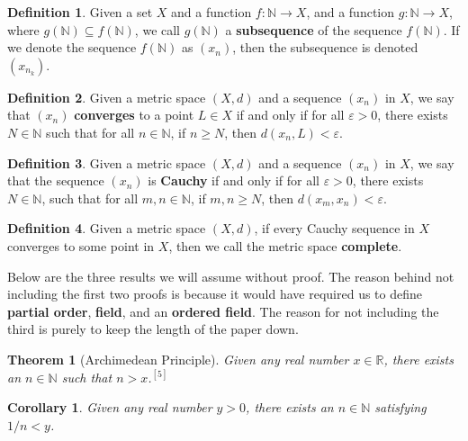 \documentclass{article}
\newtheorem{theorem}{Theorem}[section]
\newtheorem{corollary}{Corollary}[theorem]
\theoremstyle{definition}
\newtheorem{definition}{Definition}[section]
\theoremstyle{remark}
\theoremstyle{definition}
\begin{document}
\begin{definition}
    Given a set $X$ and a function $f\colon\mathbb{N}\rightarrow X$, and a function $g\colon\mathbb{N}\rightarrow X$, where $g(\mathbb{N})\subseteq f(\mathbb{N})$, we call $g(\mathbb{N})$ a \textbf{subsequence} of the sequence $f(\mathbb{N})$. If we denote the sequence $f(\mathbb{N})$ as $(x_n)$, then the subsequence is denoted $(x_{n_k})$.
\end{definition}

\begin{definition}
    Given a metric space $(X,d)$ and a sequence $(x_n)$ in $X$, we say that $(x_n)$ \textbf{converges} to a point $L\in X$ if and only if for all $\varepsilon>0$, there exists $N\in\mathbb{N}$ such that for all $n\in\mathbb{N}$, if $n\geq N$, then $d(x_n,L)<\varepsilon$.
\end{definition}

\begin{definition}
    Given a metric space $(X,d)$ and a sequence $(x_n)$ in $X$, we say that the sequence $(x_n)$ is \textbf{Cauchy} if and only if for all $\varepsilon>0$, there exists $N\in\mathbb{N}$, such that for all $m,n\in\mathbb{N}$, if $m,n\geq N$, then $d(x_m,x_n)<\varepsilon$.
\end{definition}

\begin{definition}
    Given a metric space $(X,d)$, if every Cauchy sequence in $X$ converges to some point in $X$, then we call the metric space \textbf{complete}.
\end{definition}

\vspace{4mm}

Below are the three results we will assume without proof. The reason behind not including the first two proofs is because it would have required us to define \textbf{partial order}, \textbf{field}, and an \textbf{ordered field}. The reason for not including the third is purely to keep the length of the paper down.

\vspace{4mm}

\begin{theorem}[Archimedean Principle]
    Given any real number $x\in\mathbb{R}$, there exists an $n\in\mathbb{N}$ such that $n>x$.$^{[5]}$
\end{theorem}

\begin{corollary}
    Given any real number $y>0$, there exists an $n\in\mathbb{N}$ satisfying $1/n<y$.
\end{corollary}
\end{document}
